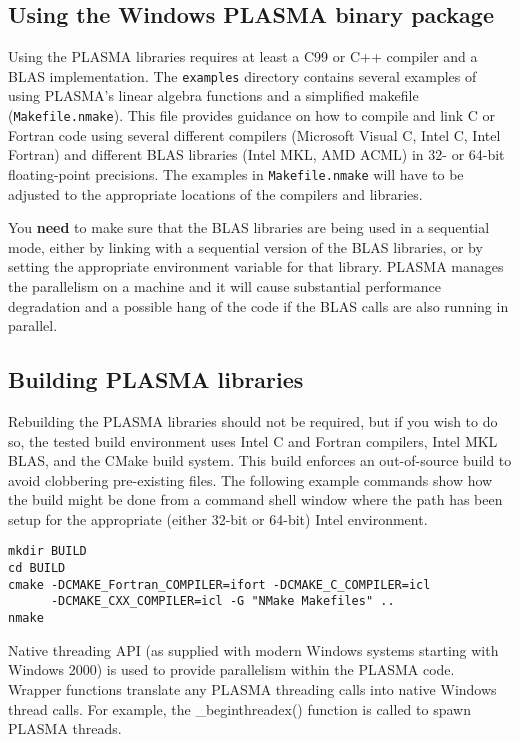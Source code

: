 \subsection{Using the Windows PLASMA binary package}
Using the PLASMA libraries requires at least a C99 or C++ compiler and a
BLAS implementation.  The \texttt{examples} directory contains several examples
of using PLASMA's linear algebra functions and a simplified makefile
(\texttt{Makefile.nmake}).  This file provides guidance on how to
compile and link C or Fortran code using several different compilers
(Microsoft Visual C, Intel C, Intel Fortran) and different BLAS
libraries (Intel MKL, AMD ACML) in 32- or 64-bit floating-point precisions.
The examples in \texttt{Makefile.nmake} will have to be adjusted to the
appropriate locations of the compilers and libraries.

You \textbf{need} to make sure that the BLAS libraries are being used
in a sequential mode, either by linking with a sequential version of the
BLAS libraries, or by setting the appropriate environment variable for
that library.  PLASMA manages the parallelism on a machine and it will
cause substantial performance degradation and a possible hang of the code
if the BLAS calls are also running in parallel.

\subsection{Building PLASMA libraries}
Rebuilding the PLASMA libraries should not be required, but if you
wish to do so, the tested build environment uses Intel C and Fortran
compilers, Intel MKL BLAS, and the CMake build system.  This build
enforces an out-of-source build to avoid clobbering pre-existing
files.  The following example commands show how the build might be
done from a command shell window where the path has been setup for the appropriate
(either 32-bit or 64-bit) Intel environment.
\begin{verbatim}
mkdir BUILD
cd BUILD
cmake -DCMAKE_Fortran_COMPILER=ifort -DCMAKE_C_COMPILER=icl 
      -DCMAKE_CXX_COMPILER=icl -G "NMake Makefiles" ..
nmake
\end{verbatim}

Native threading API (as supplied with modern Windows systems starting
with Windows 2000) is used to provide parallelism within the PLASMA code.
Wrapper functions translate any PLASMA threading calls into native Windows
thread calls.  For example, the \textsf{\_beginthreadex()} function is called
to spawn PLASMA threads.
